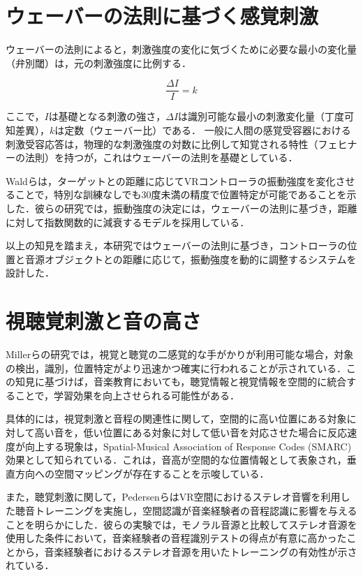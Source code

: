 \section{ウェーバーの法則に基づく感覚刺激}
ウェーバーの法則\cite{laming2009weber}によると，刺激強度の変化に気づくために必要な最小の変化量（弁別閾）は，元の刺激強度に比例する．

\begin{equation}
\frac{\Delta I}{I} = k
\end{equation}

ここで，$I$は基礎となる刺激の強さ，$\Delta I$は識別可能な最小の刺激変化量（丁度可知差異），$k$は定数（ウェーバー比）である．
一般に人間の感覚受容器における刺激受容応答は，物理的な刺激強度の対数に比例して知覚される特性（フェヒナーの法則）を持つが，これはウェーバーの法則を基礎としている．

Waldらは，ターゲットとの距離に応じてVRコントローラの振動強度を変化させることで，特別な訓練なしでも30度未満の精度で位置特定が可能であることを示した\cite{wald2025spatial}．彼らの研究では，振動強度の決定には，ウェーバーの法則に基づき，距離に対して指数関数的に減衰するモデルを採用している．

以上の知見を踏まえ，本研究ではウェーバーの法則に基づき，コントローラの位置と音源オブジェクトとの距離に応じて，振動強度を動的に調整するシステムを設計した．

\section{視聴覚刺激と音の高さ}
Millerらの研究では，視覚と聴覚の二感覚的な手がかりが利用可能な場合，対象の検出，識別，位置特定がより迅速かつ確実に行われることが示されている\cite{miller1982divided}．この知見に基づけば，音楽教育においても，聴覚情報と視覚情報を空間的に統合することで，学習効果を向上させられる可能性がある．

具体的には，視覚刺激と音程の関連性に関して，空間的に高い位置にある対象に対して高い音を，低い位置にある対象に対して低い音を対応させた場合に反応速度が向上する現象は，Spatial-Musical Association of Response Codes (SMARC) 効果として知られている\cite{rusconi2006spatial}．これは，音高が空間的な位置情報として表象され，垂直方向への空間マッピングが存在することを示唆している．

また，聴覚刺激に関して，PedersenらはVR空間におけるステレオ音響を利用した聴音トレーニングを実施し，空間認識が音楽経験者の音程認識に影響を与えることを明らかにした\cite{pedersen2020spatialized}．彼らの実験では，モノラル音源と比較してステレオ音源を使用した条件において，音楽経験者の音程識別テストの得点が有意に高かったことから，音楽経験者におけるステレオ音源を用いたトレーニングの有効性が示されている．

